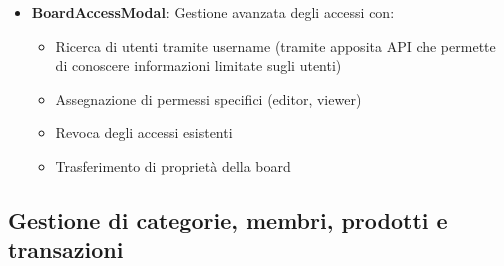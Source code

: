 \documentclass[11pt]{article}
\begin{document}
\begin{itemize}
    \item \textbf{BoardAccessModal}: Gestione avanzata degli accessi con:
    \begin{itemize}
        \item Ricerca di utenti tramite username (tramite apposita API che permette di conoscere informazioni limitate sugli utenti)
        \item Assegnazione di permessi specifici (editor, viewer)
        \item Revoca degli accessi esistenti
        \item Trasferimento di proprietà della board
    \end{itemize}
\end{itemize}

\subsection{Gestione di categorie, membri, prodotti e transazioni}
\end{document}
